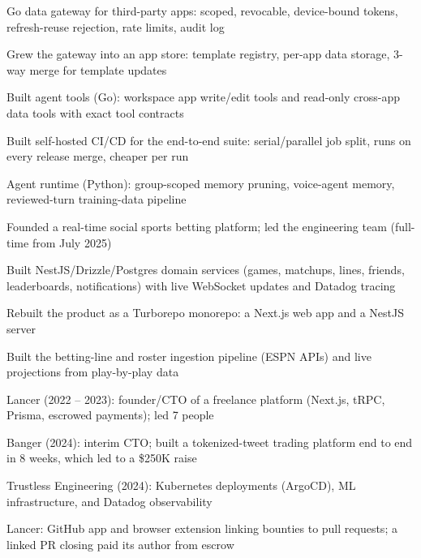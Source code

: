 \documentclass[print]{jack-resume}
\begin{document}
\begin{tightemize}
    \item Go data gateway for third-party apps: scoped, revocable, device-bound tokens, refresh-reuse rejection, rate limits, audit log
    \item Grew the gateway into an app store: template registry, per-app data storage, 3-way merge for template updates
    \item Built agent tools (Go): workspace app write/edit tools and read-only cross-app data tools with exact tool contracts
    \item Built self-hosted CI/CD for the end-to-end suite: serial/parallel job split, runs on every release merge, cheaper per run
    \item Agent runtime (Python): group-scoped memory pruning, voice-agent memory, reviewed-turn training-data pipeline
\end{tightemize}
\sectionsep

\begin{tightemize}
    \item Founded a real-time social sports betting platform; led the engineering team (full-time from July 2025)
    \item Built NestJS/Drizzle/Postgres domain services (games, matchups, lines, friends, leaderboards, notifications) with live WebSocket updates and Datadog tracing
    \item Rebuilt the product as a Turborepo monorepo: a Next.js web app and a NestJS server
    \item Built the betting-line and roster ingestion pipeline (ESPN APIs) and live projections from play-by-play data
\end{tightemize}
\sectionsep

\begin{tightemize}
    \item Lancer (2022 -- 2023): founder/CTO of a freelance platform (Next.js, tRPC, Prisma, escrowed payments); led 7 people
    \item Banger (2024): interim CTO; built a tokenized-tweet trading platform end to end in 8 weeks, which led to a \$250K raise
    \item Trustless Engineering (2024): Kubernetes deployments (ArgoCD), ML infrastructure, and Datadog observability
    \item Lancer: GitHub app and browser extension linking bounties to pull requests; a linked PR closing paid its author from escrow
\end{tightemize}
\sectionsep
\end{document}
